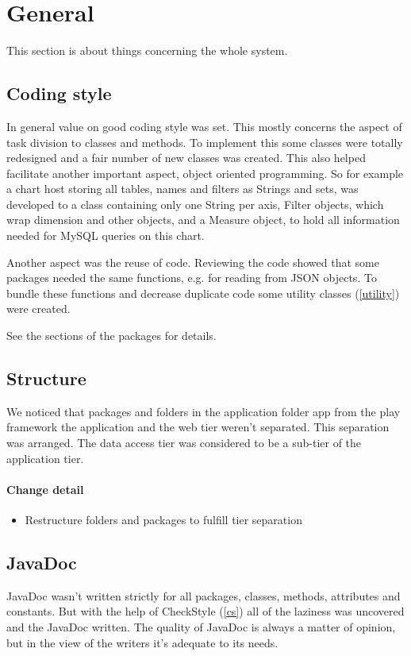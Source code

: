 \section{General}
This section is about things concerning the whole system.

\subsection{Coding style}
In general value on good coding style was set. This mostly concerns the aspect
of task division to classes and methods. To implement this some classes were totally redesigned
and a fair number of new classes was created. This also helped facilitate another important aspect, object oriented programming.
So for example a chart host storing all tables, names and filters as Strings and sets, was developed to
a class containing only one String per axis, Filter objects, which wrap dimension and other objects, and a Measure
object, to hold all information needed for MySQL queries on this chart.

Another aspect was the reuse of code. Reviewing the code showed that some packages needed the same
functions, e.g. for reading from JSON objects. To bundle these functions and
decrease duplicate code some utility classes (\ref{utility}) were created.

See the sections of the packages for details.

\subsection{Structure}
We noticed that packages and folders in the application folder app%
from the play framework the application and the web tier weren't separated. This separation was arranged. 
The data access tier was considered to be a sub-tier of the application tier. 

\paragraph{Change detail}
\begin{itemize}
  \item Restructure folders and packages to fulfill tier separation
\end{itemize}

\subsection{JavaDoc} %
JavaDoc wasn't written strictly for all packages, classes, methods, attributes and constants. 
But with the help of CheckStyle (\ref{cs}) all of the laziness was uncovered and the JavaDoc written.
The quality of JavaDoc is always a matter of opinion, but in the view of the
writers it's adequate to its needs.

